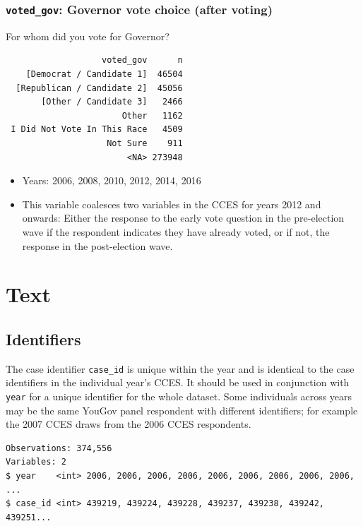 \documentclass[10pt,article,oneside]{memoir}
\theoremstyle{definition}
\begin{document}
\subsubsection{\texorpdfstring{\texttt{voted\_gov}: Governor vote choice
(after
voting)}{voted\_gov: Governor vote choice (after voting)}}\label{voted_gov-governor-vote-choice-after-voting}

For whom did you vote for Governor?

\begin{verbatim}
                   voted_gov      n
    [Democrat / Candidate 1]  46504
  [Republican / Candidate 2]  45056
       [Other / Candidate 3]   2466
                       Other   1162
 I Did Not Vote In This Race   4509
                    Not Sure    911
                        <NA> 273948
\end{verbatim}

\begin{itemize}
\tightlist
\item
  Years: 2006, 2008, 2010, 2012, 2014, 2016
\item
  This variable coalesces two variables in the CCES for years 2012 and
  onwards: Either the response to the early vote question in the
  pre-election wave if the respondent indicates they have already voted,
  or if not, the response in the post-election wave.
\end{itemize}

\newpage

\section{Text}\label{text}

\subsection{Identifiers}\label{identifiers}

The case identifier \texttt{case\_id} is unique within the year and is
identical to the case identifiers in the individual year's CCES. It
should be used in conjunction with \texttt{year} for a unique identifier
for the whole dataset. Some individuals across years may be the same
YouGov panel respondent with different identifiers; for example the 2007
CCES draws from the 2006 CCES respondents.

\begin{verbatim}
Observations: 374,556
Variables: 2
$ year    <int> 2006, 2006, 2006, 2006, 2006, 2006, 2006, 2006, 2006, ...
$ case_id <int> 439219, 439224, 439228, 439237, 439238, 439242, 439251...
\end{verbatim}
\end{document}
